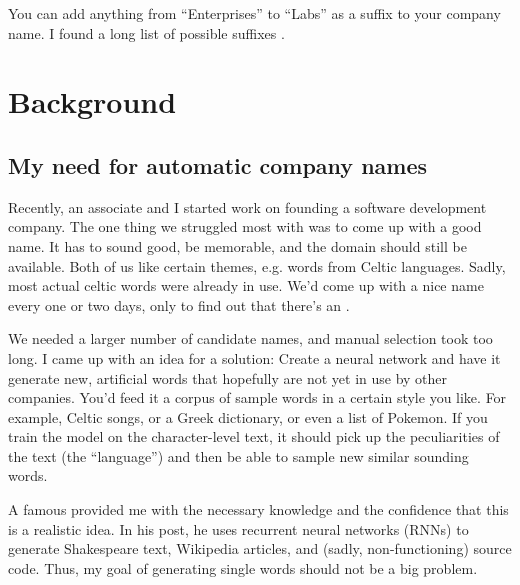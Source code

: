 \documentclass[letterpaper,10pt,english]{sphinxmanual}
\begin{document}
%
\begin{sphinxVerbatim}[commandchars=\\\{\}]
\end{sphinxVerbatim}

You can add anything from “Enterprises” to “Labs” as a suffix to your company name. I found a long list of possible suffixes .


\section{Background}
\label{\detokenize{introduction:background}}

\subsection{My need for automatic company names}
\label{\detokenize{introduction:my-need-for-automatic-company-names}}
Recently, an associate and I started work on founding a software development
company. The one thing we struggled most with was to come up with a good
name. It has to sound good, be memorable, and the domain should still be
available. Both of us like certain themes, e.g. words from Celtic
languages. Sadly, most actual celtic words were already in use. We’d come up
with a nice name every one or two days, only to find out that there’s an
.

We needed a larger number of candidate names, and manual selection took too
long. I came up with an idea for a solution: Create a neural network and have it
generate new, artificial words that hopefully are not yet in use by other
companies. You’d feed it a corpus of sample words in a certain style you
like. For example, Celtic songs, or a Greek dictionary, or even a list of
Pokemon. If you train the model on the character-level text, it should pick up
the peculiarities of the text (the “language”) and then be able to sample new
similar sounding words.

A famous  provided me with the necessary knowledge
and the confidence that this is a realistic idea. In his post, he uses recurrent
neural networks (RNNs) to generate Shakespeare text, Wikipedia articles, and
(sadly, non-functioning) source code. Thus, my goal of generating single words
should not be a big problem.
\end{document}
